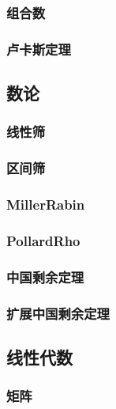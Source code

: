 \subsubsection{组合数}

\subsubsection{卢卡斯定理}


\subsection{数论}
\subsubsection{线性筛}

\subsubsection{区间筛}


\subsubsection{MillerRabin}


\subsubsection{PollardRho}


\subsubsection{中国剩余定理}

\subsubsection{扩展中国剩余定理}

\subsection{线性代数}
\subsubsection{矩阵}


